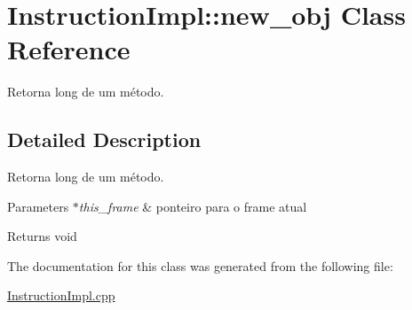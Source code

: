 \hypertarget{class_instruction_impl_1_1new__obj}{}\section{Instruction\+Impl\+:\+:new\+\_\+obj Class Reference}
\label{class_instruction_impl_1_1new__obj}


Retorna long de um método.  




\subsection{Detailed Description}
Retorna long de um método. 


\begin{DoxyParams}{Parameters}
{\em $\ast$this\+\_\+frame} & ponteiro para o frame atual \\
\hline
\end{DoxyParams}
\begin{DoxyReturn}{Returns}
void 
\end{DoxyReturn}


The documentation for this class was generated from the following file\+:\begin{DoxyCompactItemize}
\item 
\hyperlink{_instruction_impl_8cpp}{Instruction\+Impl.\+cpp}\end{DoxyCompactItemize}
